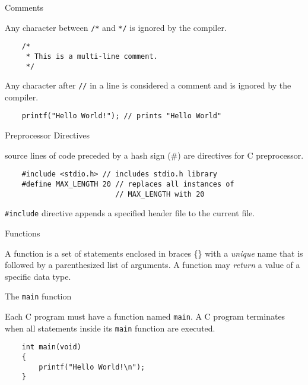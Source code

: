 \documentclass[compress]{beamer}
\begin{document}
\begin{slide}
	\begin{block}{Comments}

	Any character between \alert{\texttt{/*}} and \alert{\texttt{*/}} is ignored by the compiler.

	\begin{verbatim}
	/*
	 * This is a multi-line comment.
	 */
	\end{verbatim}

	Any character after \alert{\texttt{//}} in a line is considered a comment and is ignored by the compiler.

	\begin{verbatim}
	printf("Hello World!"); // prints "Hello World"
	\end{verbatim}

	\end{block}
\end{slide}

\begin{slide}
	\begin{block}{Preprocessor Directives}

	source lines of code preceded by a hash sign (\#) are directives for C preprocessor.

	\begin{verbatim}
	#include <stdio.h> // includes stdio.h library
	#define MAX_LENGTH 20 // replaces all instances of
	                      // MAX_LENGTH with 20
	\end{verbatim}

	\alert{\texttt{\#include}} directive appends a specified header file to the current file.

	\end{block}
\end{slide}

\begin{slide}
	\begin{block}{Functions}

	A \alert{function} is a set of statements enclosed in braces \{\} with a \emph{unique} name that is followed by a parenthesized list of arguments.
	A function may \emph{return} a value of a specific data type.

	\end{block}
\end{slide}

\begin{slide}
	\begin{block}{The \texttt{main} function}

	Each C program must have a function named \texttt{main}.
	A C program terminates when all statements inside its \texttt{main} function are executed.

	\begin{verbatim}
	int main(void)
	{
	    printf("Hello World!\n");
	}
	\end{verbatim}

	\end{block}
\end{slide}
\end{document}
